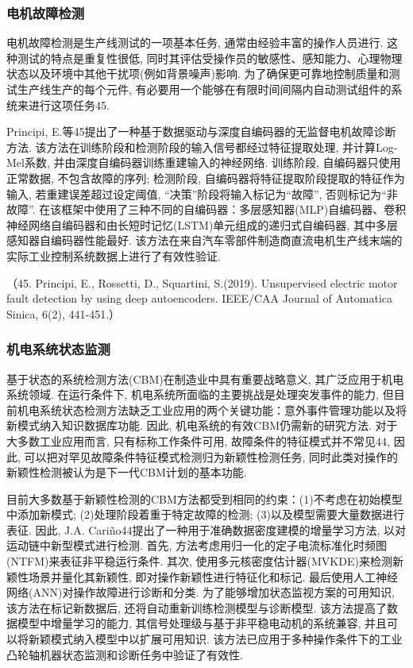 \documentclass{Style/aas}
\begin{document}
\begin{multicols}{2}
  \subsubsection{电机故障检测}
  电机故障检测是生产线测试的一项基本任务, 通常由经验丰富的操作人员进行. 这种测试的特点是重复性很低, 同时其评估受操作员的敏感性、感知能力、心理物理状态以及环境中其他干扰项(例如背景噪声)影响. 为了确保更可靠地控制质量和测试生产线生产的每个元件, 有必要用一个能够在有限时间间隔内自动测试组件的系统来进行这项任务45.

  Principi, E.等45提出了一种基于数据驱动与深度自编码器的无监督电机故障诊断方法. 该方法在训练阶段和检测阶段的输入信号都经过特征提取处理, 并计算Log-Mel系数, 并由深度自编码器训练重建输入的神经网络. 训练阶段, 自编码器只使用正常数据, 不包含故障的序列; 检测阶段, 自编码器将特征提取阶段提取的特征作为输入, 若重建误差超过设定阈值, “决策”阶段将输入标记为“故障”, 否则标记为“非故障”. 在该框架中使用了三种不同的自编码器：多层感知器(MLP)自编码器、卷积神经网络自编码器和由长短时记忆(LSTM)单元组成的递归式自编码器, 其中多层感知器自编码器性能最好. 该方法在来自汽车零部件制造商直流电机生产线末端的实际工业控制系统数据上进行了有效性验证.

  （45.	Principi, E., Rossetti, D., Squartini, S.(2019). Unsupervised electric motor fault detection by using deep autoencoders. IEEE/CAA Journal of Automatica Sinica, 6(2), 441-451.）

  \subsubsection{机电系统状态监测}
  基于状态的系统检测方法(CBM)在制造业中具有重要战略意义, 其广泛应用于机电系统领域. 在运行条件下, 机电系统所面临的主要挑战是处理突发事件的能力, 但目前机电系统状态检测方法缺乏工业应用的两个关键功能：意外事件管理功能以及将新模式纳入知识数据库功能. 因此, 机电系统的有效CBM仍需新的研究方法. 对于大多数工业应用而言, 只有标称工作条件可用, 故障条件的特征模式并不常见44, 因此, 可以把对罕见故障条件特征模式检测归为新颖性检测任务, 同时此类对操作的新颖性检测被认为是下一代CBM计划的基本功能.

  目前大多数基于新颖性检测的CBM方法都受到相同的约束：(1)不考虑在初始模型中添加新模式; (2)处理阶段着重于特定故障的检测; (3)以及模型需要大量数据进行表征. 因此, J.A. Cariño44提出了一种用于准确数据密度建模的增量学习方法, 以对运动链中新型模式进行检测. 首先, 方法考虑用归一化的定子电流标准化时频图(NTFM)来表征非平稳运行条件. 其次, 使用多元核密度估计器(MVKDE)来检测新颖性场景并量化其新颖性, 即对操作新颖性进行特征化和标记. 最后使用人工神经网络(ANN)对操作故障进行诊断和分类. 为了能够增加状态监视方案的可用知识, 该方法在标记新数据后, 还将自动重新训练检测模型与诊断模型. 该方法提高了数据模型中增量学习的能力, 其信号处理级与基于非平稳电动机的系统兼容, 并且可以将新颖模式纳入模型中以扩展可用知识. 该方法已应用于多种操作条件下的工业凸轮轴机器状态监测和诊断任务中验证了有效性.


\end{multicols}
\end{document}
